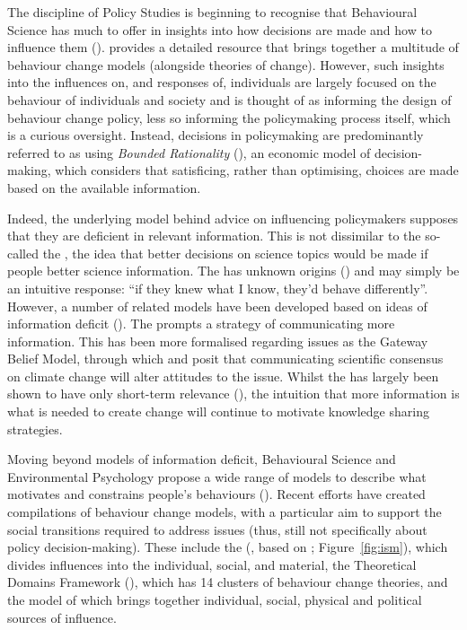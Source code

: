 The discipline of Policy Studies is beginning to recognise that Behavioural Science has much to offer in insights into how decisions are made and how to influence them (\cite{CairneyW2017}). \textcite{Darnton2008} provides a detailed resource that brings together a multitude of behaviour change models (alongside theories of change). However, such insights into the influences on, and responses of, individuals are largely focused on the behaviour of individuals and society and is thought of as informing the design of behaviour change policy,  less so informing the policymaking process itself, which is a curious oversight. Instead, decisions in policymaking are predominantly referred to as using \emph{Bounded Rationality} (\cite{CairneyO2020,CairneyTS2023}), an economic model of decision-making, which considers that satisficing, rather than optimising, choices are made based on the available information. 

Indeed, the underlying model behind advice on influencing policymakers supposes that they are deficient in relevant information. This is not dissimilar to the so-called the \IDM{}, the idea that better decisions on science topics would be made if people better science information. The \IDM{} has unknown origins (\cite{Nerlich2017}) and may simply be an intuitive response: ``if they knew what I know, they'd behave differently''. However, a number of related models have been developed based on ideas of information deficit (\cite{Darnton2008}). The \IDM{} prompts a strategy of communicating more information. This has been more formalised regarding \CAN{} issues as the Gateway Belief Model, through which \textcite{vanderLindenLFM2015} and \textcite{vanderLinden2021} posit that communicating scientific consensus on climate change will alter attitudes to the issue. Whilst the \IDM{} has largely been shown to have only short-term relevance (\cite[p24-5]{BA2024trust}), the intuition that more information is what is needed to create change will continue to motivate knowledge sharing strategies.

Moving beyond models of information deficit, Behavioural Science and Environmental Psychology propose a wide range of models to describe what motivates and constrains people's behaviours (\cite{Darnton2008}). Recent efforts have created compilations of behaviour change models, with a particular aim to support the social transitions required to address \CAN{} issues (thus, still not specifically about policy decision-making). These include the \ISM{} (\cite{DarntonH2013}, based on \cite{SouthertonME2011}; Figure~\ref{fig:ism}), which divides influences into the individual, social, and material, the Theoretical Domains Framework (\cite{AtkinsFIOPIFDCGLM2017}), which has 14 clusters of behaviour change theories, and the model of \textcite{HamptonW2023} which brings together individual, social, physical and political sources of influence.

